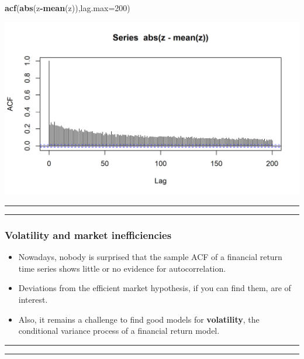 \documentclass[]{article}
\newenvironment{Shaded}{\begin{snugshade}}{\end{snugshade}}
\newcommand{\KeywordTok}[1]{\textcolor[rgb]{0.13,0.29,0.53}{\textbf{#1}}}
\newcommand{\DataTypeTok}[1]{\textcolor[rgb]{0.13,0.29,0.53}{#1}}
\newcommand{\DecValTok}[1]{\textcolor[rgb]{0.00,0.00,0.81}{#1}}
\newcommand{\OperatorTok}[1]{\textcolor[rgb]{0.81,0.36,0.00}{\textbf{#1}}}
\newcommand{\NormalTok}[1]{#1}
\begin{document}
\begin{Shaded}
\begin{Highlighting}[]
\KeywordTok{acf}\NormalTok{(}\KeywordTok{abs}\NormalTok{(z}\OperatorTok{-}\KeywordTok{mean}\NormalTok{(z)),}\DataTypeTok{lag.max=}\DecValTok{200}\NormalTok{)}
\end{Highlighting}
\end{Shaded}

\includegraphics{figure/intro-sp500_abs_return_acf-1.png}



\begin{center}\rule{0.5\linewidth}{\linethickness}\end{center}

\begin{center}\rule{0.5\linewidth}{\linethickness}\end{center}

\subsubsection{Volatility and market
inefficiencies}\label{volatility-and-market-inefficiencies}

\begin{itemize}
\item
  Nowadays, nobody is surprised that the sample ACF of a financial
  return time series shows little or no evidence for autocorrelation.
\item
  Deviations from the efficient market hypothesis, if you can find them,
  are of interest.
\item
  Also, it remains a challenge to find good models for
  \textbf{volatility}, the conditional variance process of a financial
  return model.
\end{itemize}

\begin{center}\rule{0.5\linewidth}{\linethickness}\end{center}

\begin{center}\rule{0.5\linewidth}{\linethickness}\end{center}
\end{document}

